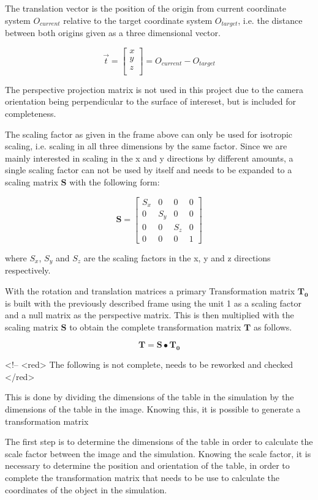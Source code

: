 The translation vector is the position of the origin from current coordinate system $O_{current}$ 
relative to the target coordinate system $O_{target}$, i.e. the distance between both origins given as a three dimensional vector. 

$$
\vec{t} =
\begin{bmatrix}
x\\
y\\
z\\
\end{bmatrix}=
O_{current}-O_{target}
$$

The perspective projection matrix is not used in this project due to the camera orientation being perpendicular to the surface of intereset, but is included for completeness.

The scaling factor as given in the frame above can only be used for isotropic scaling, i.e. scaling in all three dimensions by the same factor. Since we are mainly interested in scaling in the x and y directions by different amounts, a single scaling factor can not be used by itself and needs to be expanded to a scaling matrix $\mathbf{S}$ with the following form:

$$
\mathbf{S}=
\begin{bmatrix}
S_x & 0 & 0   & 0\\
0 & S_y & 0   & 0\\
0 & 0   & S_z & 0\\
0 & 0   & 0   & 1
\end{bmatrix}
$$


where $S_x$, $S_y$ and $S_z$ are the scaling factors in the x, y and z directions respectively.

With the rotation and translation matrices a primary Transformation matrix $\mathbf{T_{0}}$ is built with the previously described frame using the unit 1 as a scaling factor and a null matrix as the perspective matrix. 
This is then multiplied with the scaling matrix $\mathbf{S}$ to obtain the complete transformation matrix $\mathbf{T}$ as follows. 

$$\mathbf{T} =  \mathbf{S} \bullet  \mathbf{T_{0}}$$


<!-- 
<red> The following is not complete, needs to be reworked and checked </red>

This is done by dividing the dimensions of the table in the simulation by the dimensions of the table in the image. Knowing this, it is possible to generate a transformation matrix

The first step is to determine the dimensions of the table in order to calculate the scale factor between the image and the simulation. Knowing the scale factor, it is necessary to determine the position and orientation of the table, in order to complete the transformation matrix that needs to be use to calculate the coordinates of the object in the simulation.

